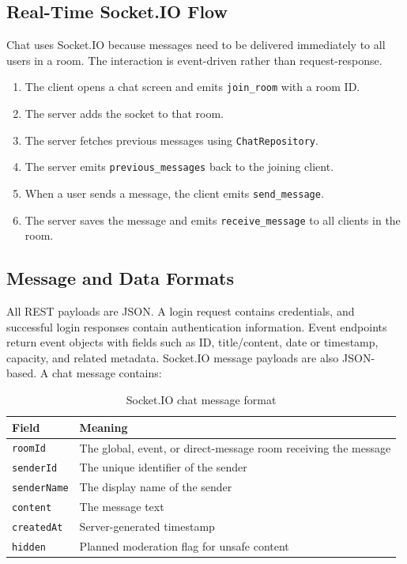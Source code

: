 \documentclass[12pt,a4paper]{article}
\begin{document}
\subsection{Real-Time Socket.IO Flow}
Chat uses Socket.IO because messages need to be delivered immediately to all users in a
room. The interaction is event-driven rather than request-response.
\begin{enumerate}
  \item The client opens a chat screen and emits \texttt{join\_room} with a room ID.
  \item The server adds the socket to that room.
  \item The server fetches previous messages using \texttt{ChatRepository}.
  \item The server emits \texttt{previous\_messages} back to the joining client.
  \item When a user sends a message, the client emits \texttt{send\_message}.
  \item The server saves the message and emits \texttt{receive\_message} to all clients in the room.
\end{enumerate}
\subsection{Message and Data Formats}
All REST payloads are JSON. A login request contains credentials, and successful login
responses contain authentication information. Event endpoints return event objects with
fields such as ID, title/content, date or timestamp, capacity, and related metadata.
Socket.IO message payloads are also JSON-based. A chat message contains:
\begin{table}[H]
\centering
\caption{Socket.IO chat message format}
\begin{tabularx}{0.86\textwidth}{@{}l X@{}}
\toprule
\textbf{Field} & \textbf{Meaning} \\
\midrule
\texttt{roomId} & The global, event, or direct-message room receiving the message \\
\texttt{senderId} & The unique identifier of the sender \\
\texttt{senderName} & The display name of the sender \\
\texttt{content} & The message text \\
\texttt{createdAt} & Server-generated timestamp \\
\texttt{hidden} & Planned moderation flag for unsafe content \\
\bottomrule
\end{tabularx}
\end{table}
\end{document}
